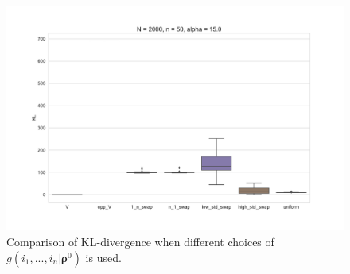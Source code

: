 \documentclass[11pt, oneside]{article}   	%
\begin{document}
\begin{figure}[h!]
\begin{minipage}[t]{.23\textwidth}
		\end{minipage}
		\hfill
		\begin{minipage}[t]{.23\textwidth}
			\centering
			\includegraphics[width=\textwidth]{figures/theorem2_2/N2000n50alpha15.pdf}
			
		\end{minipage} 
	
	
	\caption{Comparison of KL-divergence when different choices of $g(i_1, ...,i_n|\bm{\rho}^0)$ is used. }
	\label{fig:boxPlots}
\end{figure}
\end{document}
